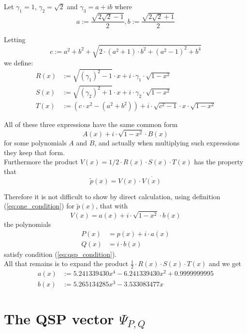 \documentclass{article}
\begin{document}
\noindent Let $\gamma_1 = 1$, $\gamma_2 = \sqrt{2}$ and $\gamma_3 = a+ib$ where
$$
a := \frac{\sqrt{2\sqrt{2}-1}}{2}, b := \frac{\sqrt{2\sqrt{2}+1}}{2}
$$

\noindent Letting 
$$
c := a^2 + b^2 + \sqrt{2 \cdot (a^2+1) \cdot b^2 + (a^2-1)^2 + b^4}
$$
we define:
\begin{align*}
    R(x) &:= \sqrt{(\gamma_1)^2 - 1} \cdot x + i \cdot \gamma_1 \cdot \sqrt{1-x^2} \\
    S(x) &:= \sqrt{(\gamma_2)^2 + 1} \cdot x + i \cdot \gamma_2 \cdot \sqrt{1-x^2} \\
    T(x) &:= (c \cdot x^2 - (a^2 + b^2)) + i \cdot \sqrt{c^2 - 1} \cdot x \cdot \sqrt{1-x^2}
\end{align*}

\noindent All of these three expressions have the same common form
$$
A(x) + i \cdot \sqrt{1-x^2} \cdot B(x)
$$
for some polynomials $A$ and $B$, and actually when multiplying such expressions they keep that form.\\

\noindent Furthermore the product $V(x) = 1/2\cdot R(x) \cdot S(x) \cdot T(x)$ has the property that
$$
\tilde{p}(x) = V(x) \cdot \overline{V(x)}
$$

\noindent Therefore it is not difficult to show by direct calculation, using definition (\ref{eq:one_condition}) for $\tilde{p}(x)$, that with 
$$
V(x) = a(x) + i \cdot \sqrt{1-x^2} \cdot b(x)
$$
the polynomials
\begin{align*}
P(x) & = p(x) + i \cdot a(x) \\
Q(x) & = i \cdot b(x)
\end{align*}
satisfy condition  (\ref{eq:qsp_condition}).\\

\noindent All that remains is to expand the product $\frac{1}{2}\cdot R(x)\cdot S(x)\cdot T(x)$ and we get
\begin{align*}
    a(x) &:= 5.241339430x^4 - 6.241339430x^2 + 0.9999999995 \\
    b(x) &:= 5.265134285x^3 - 3.533083477x
\end{align*}

%
%

\section*{The QSP vector $\Psi_{P,Q}$}
\end{document}

